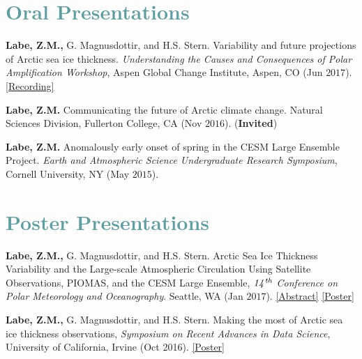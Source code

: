 \documentclass[margin,line,palatino,courier,10pt]{res}
\begin{document}
\begin{resume}
\section{\sc \textcolor{CadetBlue}{\large{Oral Presentations}}}
\begin{etaremune}[leftmargin=0in,topsep=0in,parsep=0in]
\item \textbf{Labe, Z.M.,} G. Magnusdottir, and H.S. Stern. Variability and future projections of Arctic sea ice thickness. \textit{Understanding the Causes and Consequences of Polar Amplification Workshop}, Aspen Global Change Institute, Aspen, CO (Jun $2017$). \href{https://www.agci.org/lib/17s1/variability-and-future-projections-arctic-sea-ice-thickness}{[Recording]}
\item \textbf{Labe, Z.M.} Communicating the future of Arctic climate change. Natural Sciences Division, Fullerton College, CA (Nov $2016$). (\textbf{Invited})
\item \textbf{Labe, Z.M.} Anomalously early onset of spring in the CESM Large Ensemble Project. \textit{Earth and Atmospheric Science Undergraduate Research Symposium}, Cornell University, NY (May $2015$). 

\end{etaremune}

\section{\sc \textcolor{CadetBlue}{\large{Poster Presentations}}}
\begin{etaremune}[leftmargin=0in,topsep=0in,parsep=0in]
\item \textbf{Labe, Z.M.,} G. Magnusdottir, and H.S. Stern. Arctic Sea Ice Thickness Variability and the Large-scale Atmospheric Circulation Using Satellite Observations, PIOMAS, and the CESM Large Ensemble, \textit{$\it{14^{th}}$ Conference on Polar Meteorology and Oceanography}. Seattle, WA (Jan $2017$). \href{https://ams.confex.com/ams/97Annual/webprogram/Paper313445.html}{[Abstract]} \href{http://sites.uci.edu/zlabe/files/2017/01/ZLabeMagnusdottirStern_AMSposter_2017.pdf}{[Poster]}

\item \textbf{Labe, Z.M.,} G. Magnusdottir, and H.S. Stern. Making the most of Arctic sea ice thickness observations, \textit{Symposium on Recent Advances in Data Science}, University of California, Irvine (Oct 2016). \href{http://sites.uci.edu/zlabe/files/2016/10/ZLabeMagnusdottirStern_DSIposter_Oct16.pdf}{[Poster]}


\end{etaremune}
\end{resume}
\end{document}
